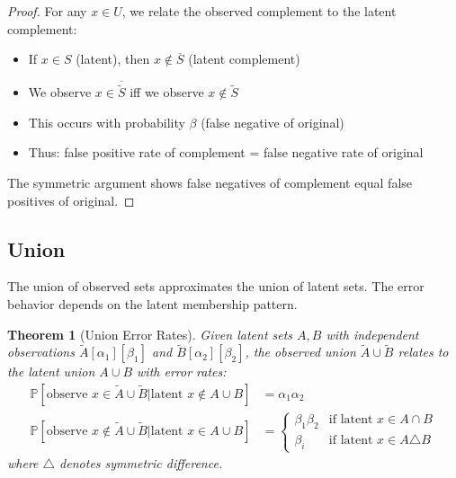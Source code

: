 \documentclass[11pt,final,hidelinks]{article}
\newtheorem{theorem}{Theorem}[section]
\newcommand{\obs}[1]{\widetilde{#1}}  %
\newcommand{\SetComplement}[1]{\overline{#1}}
\newcommand{\SetUnion}{\cup}
\newcommand{\Prob}[1]{\mathbb{P}\left[#1\right]}
\newcommand{\fprate}{\alpha}
\newcommand{\fnrate}{\beta}
\begin{document}
\begin{proof}
For any $x \in U$, we relate the observed complement to the latent complement:
\begin{itemize}
    \item If $x \in S$ (latent), then $x \notin \SetComplement{S}$ (latent complement)
    \item We observe $x \in \SetComplement{\obs{S}}$ iff we observe $x \notin \obs{S}$
    \item This occurs with probability $\fnrate$ (false negative of original)
    \item Thus: false positive rate of complement = false negative rate of original
\end{itemize}
The symmetric argument shows false negatives of complement equal false positives of original.
\end{proof}

\subsection{Union}

The union of observed sets approximates the union of latent sets. The error behavior depends on the latent membership pattern.

\begin{theorem}[Union Error Rates]
Given latent sets $A, B$ with independent observations $\obs{A}[\fprate_1][\fnrate_1]$ and $\obs{B}[\fprate_2][\fnrate_2]$, the observed union $\obs{A} \SetUnion \obs{B}$ relates to the latent union $A \SetUnion B$ with error rates:
\begin{align}
\Prob{\text{observe } x \in \obs{A} \SetUnion \obs{B} | \text{latent } x \notin A \SetUnion B} &= \fprate_1 \fprate_2 \\
\Prob{\text{observe } x \notin \obs{A} \SetUnion \obs{B} | \text{latent } x \in A \SetUnion B} &= \begin{cases}
\fnrate_1 \fnrate_2 & \text{if latent } x \in A \cap B \\
\fnrate_i & \text{if latent } x \in A \triangle B
\end{cases}
\end{align}
where $\triangle$ denotes symmetric difference.
\end{theorem}
\end{document}
